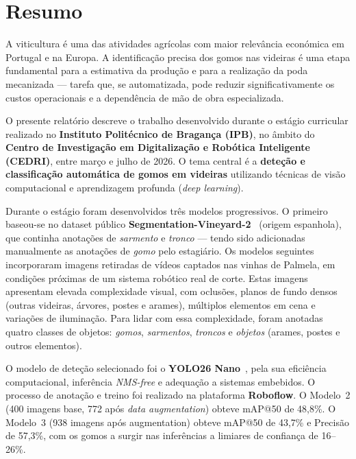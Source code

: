 \chapter*{Resumo}

A viticultura é uma das atividades agrícolas com maior relevância económica em
Portugal e na Europa. A identificação precisa dos gomos nas videiras é uma
etapa fundamental para a estimativa da produção e para a realização da poda
mecanizada — tarefa que, se automatizada, pode reduzir significativamente os
custos operacionais e a dependência de mão de obra especializada.

O presente relatório descreve o trabalho desenvolvido durante o estágio
curricular realizado no \textbf{Instituto Politécnico de Bragança (IPB)}, no
âmbito do \textbf{Centro de Investigação em Digitalização e Robótica
Inteligente (CEDRI)}, entre março e julho de 2026. O tema central é a
\textbf{deteção e classificação automática de gomos em videiras} utilizando
técnicas de visão computacional e aprendizagem profunda (\textit{deep
learning}).

Durante o estágio foram desenvolvidos três modelos progressivos. O primeiro
baseou-se no dataset público \textbf{Segmentation-Vineyard-2}~\cite{vinya2024segvineyard}
(origem espanhola), que continha anotações de \textit{sarmento} e
\textit{tronco} — tendo sido adicionadas manualmente as anotações de
\textit{gomo} pelo estagiário. Os modelos seguintes incorporaram imagens
retiradas de vídeos captados nas vinhas de Palmela, em condições próximas
de um sistema robótico real de corte.
Estas imagens apresentam elevada complexidade visual, com oclusões, planos
de fundo densos (outras videiras, árvores, postes e arames), múltiplos
elementos em cena e variações de iluminação. Para lidar com essa complexidade,
foram anotadas quatro classes de objetos: \textit{gomos}, \textit{sarmentos},
\textit{troncos} e \textit{objetos} (arames, postes e outros elementos).

O modelo de deteção selecionado foi o \textbf{YOLO26 Nano}~\cite{hidayatullah2026yolo26},
pela sua eficiência computacional, inferência \textit{NMS-free} e adequação a sistemas
embebidos. O processo de anotação e treino foi realizado na plataforma
\textbf{Roboflow}. O Modelo~2 (400 imagens base, 772 após \textit{data
augmentation}) obteve mAP@50 de 48,8\%. O Modelo~3 (938 imagens após
augmentation) obteve mAP@50 de 43,7\% e Precisão de 57,3\%, com os gomos
a surgir nas inferências a limiares de confiança de 16--26\%.

